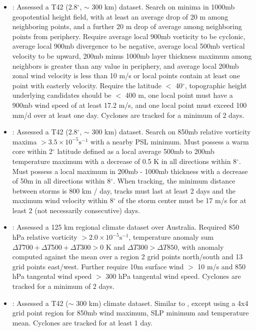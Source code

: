 \documentclass[gmdd, hvmath, online]{copernicus_discussions}
\begin{document}
\begin{itemize}
\item \cite{tsutsui1996simulated}:  Assessed a T42 (2.8$^\circ$, $\sim$ 300 km) dataset.  Search on minima in 1000mb geopotential height field, with at least an average drop of 20 m among neighboring points, and a further 20 m drop of average among neighboring points from periphery.  Require average local 900mb vorticity to be cyclonic, average local 900mb divergence to be negative, average local 500mb vertical velocity to be upward, 200mb minus 1000mb layer thickness maximum among neighbors is greater than any value in periphery, and average local 200mb zonal wind velocity is less than 10 m/s or local points contain at least one point with easterly velocity.  Require the latitude $<$ 40$^\circ$, topographic height underlying candidates should be $<$ 400 m, one local point must have a 900mb wind speed of at least 17.2 m/s, and one local point must exceed 100 mm/d over at least one day.  Cyclones are tracked for a minimum of 2 days.

\item \cite{vitart1997simulation, vitart1999impact, vitart2001sensitivity}:  Assessed a T42 (2.8$^\circ$, $\sim$ 300 km) dataset.  Search on 850mb relative vorticity maxima $> 3.5 \times 10^{-5} \mbox{s}^{-1}$ with a nearby PSL minimum.  Must possess a warm core within 2$^\circ$ latitude defined as a local average 500mb to 200mb temperature maximum with a decrease of 0.5 K in all directions within 8$^\circ$.  Must possess a local maximum in 200mb - 1000mb thickness with a decrease of 50m in all directions within 8$^\circ$.  When tracking, the minimum distance between storms is 800 km / day, tracks must last at least 2 days and the maximum wind velocity within 8$^\circ$ of the storm center must be 17 m/s for at least 2 (not necessarily consecutive) days.

\item \cite{walsh1997objective, walsh1997tropical, walsh2000impact}:  Assessed a 125 km regional climate dataset over Australia.  Required 850 hPa relative vorticity $> 2.0 \times 10^{-5} \mbox{s}^{-1}$, temperature anomaly sum $\Delta T700+ \Delta T500+ \Delta T300 > 0$ K and $\Delta T300 > \Delta T850$, with anomaly computed against the mean over a region 2 grid points north/south and 13 grid points east/west.  Further require 10m surface wind $>$ 10 m/s and 850 hPa tangental wind speed $>$ 300 hPa tangental wind speed.  Cyclones are tracked for a minimum of 2 days.

\item \cite{krishnamurti1998impact}:  Assessed a T42 ($\sim$ 300 km) climate dataset.  Similar to \cite{bengtsson1995hurricane, bengtsson1996will}, except using a 4x4 grid point region for 850mb wind maximum, SLP minimum and temperature mean.  Cyclones are tracked for at least 1 day.


\end{itemize}
\end{document}
